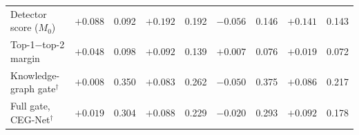 \begin{table}[t]
{\begin{tabular}{lrrrrrrrr}
Detector score ($M_0$) & $+0.088$ & 0.092 & $+0.192$ & 0.192 & $-0.056$ & 0.146 & $+0.141$ & 0.143 \\
Top-1$-$top-2 margin & $+0.048$ & 0.098 & $+0.092$ & 0.139 & $+0.007$ & 0.076 & $+0.019$ & 0.072 \\
Knowledge-graph gate$^{\dagger}$ & $+0.008$ & 0.350 & $+0.083$ & 0.262 & $-0.050$ & 0.375 & $+0.086$ & 0.217 \\
Full gate, CEG-Net$^{\dagger}$ & $+0.019$ & 0.304 & $+0.088$ & 0.229 & $-0.020$ & 0.293 & $+0.092$ & 0.178 \\
\bottomrule
\end{tabular}}
\par{}
\end{table}
